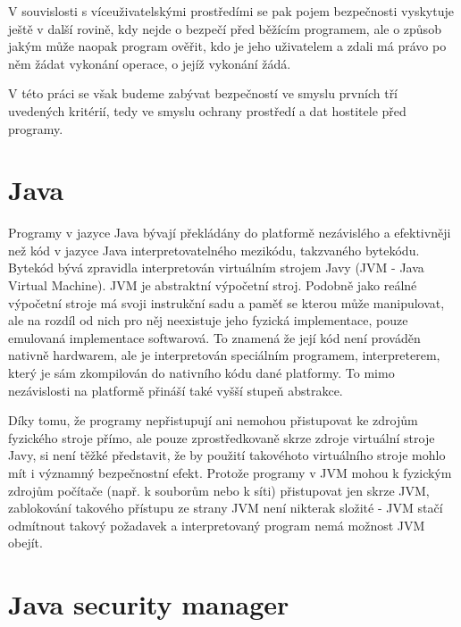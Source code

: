 V souvislosti s víceuživatelskými prostředími se pak pojem bezpečnosti vyskytuje ještě v další rovině, kdy nejde o bezpečí před běžícím programem, ale o způsob jakým může naopak program ověřit, kdo je jeho uživatelem a zdali má právo po něm žádat vykonání operace, o jejíž vykonání žádá.

V této práci se však budeme zabývat bezpečností ve smyslu prvních tří uvedených kritérií, tedy ve smyslu ochrany prostředí a dat hostitele před programy.

\section{Java}

Programy v jazyce Java bývají překládány do platformě nezávislého a efektivněji než kód v jazyce Java interpretovatelného mezikódu, takzvaného bytekódu.
Bytekód bývá zpravidla interpretován virtuálním strojem Javy (JVM - Java Virtual Machine).
JVM je abstraktní výpočetní stroj. Podobně jako reálné výpočetní stroje má svoji instrukční sadu a paměť se kterou může manipulovat, ale na rozdíl od nich pro něj neexistuje jeho fyzická implementace, pouze emulovaná implementace softwarová.
To znamená že její kód není prováděn nativně hardwarem, ale je interpretován speciálním programem, interpreterem, který je sám zkompilován do nativního kódu dané platformy.
To mimo nezávislosti na platformě přináší také vyšší stupeň abstrakce.

Díky tomu, že programy nepřistupují ani nemohou přistupovat ke zdrojům fyzického stroje přímo, ale pouze zprostředkovaně skrze zdroje virtuální stroje Javy, si není těžké představit, že by použití takovéhoto virtuálního stroje mohlo mít i významný bezpečnostní efekt.
Protože programy v JVM mohou k fyzickým zdrojům počítače (např. k souborům nebo k síti) přistupovat jen skrze JVM, zablokování takového přístupu ze strany JVM není nikterak složité - JVM stačí odmítnout takový požadavek a interpretovaný program nemá možnost JVM obejít.

\section{Java security manager} \label{securityManager}

